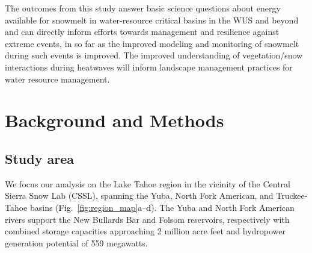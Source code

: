 \documentclass[12pt]{iopjournal}
\newcommand{\fig}[2]{\textcolor{black}{(Fig.~\ref{#1}{#2})}}   %
\begin{document}
The outcomes from this study answer basic science questions about energy available for snowmelt in water-resource critical basins in the WUS and beyond and can directly inform efforts towards management and resilience against extreme events, in so far as the improved modeling and monitoring of snowmelt during such events is improved.
The improved understanding of vegetation/snow interactions during heatwaves will inform landscape management practices for water resource management.






\section{Background and Methods}
\subsection{Study area}
We focus our analysis on the Lake Tahoe region in the vicinity of the Central Sierra Snow Lab (CSSL), spanning the Yuba, North Fork American, and Truckee-Tahoe basins \fig{fig:region_map}{a--d}.
The Yuba and North Fork American rivers support the New Bullards Bar and Folsom reservoirs, respectively with combined storage capacities approaching 2 million acre feet and hydropower generation potential of 559 megawatts. 
\end{document}

